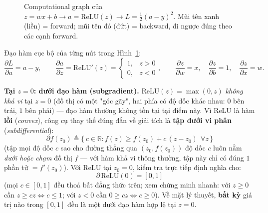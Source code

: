 \documentclass[12pt,a4paper]{article}
\newcommand{\en}[1]{\textit{#1}}
\begin{document}
\begin{figure}[H]
\centering
{}
\caption{Computational graph của $z=wx+b \to a=\mathrm{ReLU}(z) \to L=\tfrac12(a-y)^2$.
Mũi tên xanh (liền) = forward; mũi tên đỏ (đứt) = backward, đi ngược đúng
theo các cạnh forward.}
\label{fig:compgraph}
\end{figure}

Đạo hàm cục bộ của từng nút trong Hình~\ref{fig:compgraph}:
$$\frac{\partial L}{\partial a}=a-y,\qquad
\frac{\partial a}{\partial z}=\mathrm{ReLU}'(z)=\begin{cases}1,& z>0\\0,& z< 0\end{cases},\qquad
\frac{\partial z}{\partial w}=x,\quad \frac{\partial z}{\partial b}=1,\quad \frac{\partial z}{\partial x}=w.$$

\textbf{Tại $z=0$: dưới đạo hàm (subgradient).} $\mathrm{ReLU}(z)=\max(0,z)$
\emph{không khả vi} tại $z=0$ (đồ thị có một "góc gãy", hai phía có độ dốc
khác nhau: $0$ bên trái, $1$ bên phải) --- đạo hàm thường không tồn tại tại
điểm này. Vì ReLU là hàm \textbf{lồi} (\en{convex}), công cụ thay thế đúng
đắn về giải tích là \textbf{tập dưới vi phân} (\en{subdifferential}):
$$\partial f(z_0) \triangleq \{\,c\in\mathbb R : f(z) \ge f(z_0) + c\,(z-z_0)\ \ \forall z\,\}$$
(tập mọi độ dốc $c$ sao cho đường thẳng qua $(z_0,f(z_0))$ độ dốc $c$ luôn
nằm \emph{dưới hoặc chạm} đồ thị $f$ --- với hàm khả vi thông thường, tập
này chỉ có đúng $1$ phần tử $=f'(z_0)$). Với $\mathrm{ReLU}$ tại $z_0=0$,
kiểm tra trực tiếp định nghĩa cho:
$$\partial\,\mathrm{ReLU}(0) = [0,1]$$
(mọi $c\in[0,1]$ đều thoả bất đẳng thức trên; xem chứng minh nhanh:
với $z\ge0$ cần $z\ge cz\Leftrightarrow c\le1$; với $z<0$ cần $0\ge cz
\Leftrightarrow c\ge0$). Về mặt lý thuyết, \textbf{bất kỳ} giá trị nào
trong $[0,1]$ đều là một dưới đạo hàm hợp lệ tại $z=0$.
\end{document}
